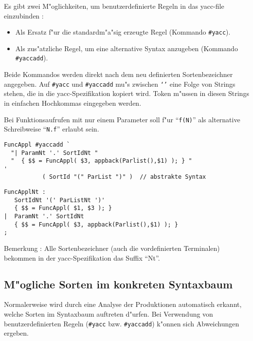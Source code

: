 Es gibt zwei M"oglichkeiten, um benutzerdefinierte Regeln in das yacc-file
einzubinden :

\begin{itemize}
\item Als Ersatz f"ur die standardm"a"sig erzeugte Regel
(Kommando {\tt \#yacc}).

\item Als zus"atzliche Regel, um eine alternative Syntax
anzugeben (Kommando {\tt \#yaccadd}).
\end{itemize}

\noindent
Beide Kommandos werden direkt nach dem neu definierten Sortenbezeichner
angegeben. Auf {\tt \#yacc} und {\tt \#yaccadd} mu"s zwischen {\tt `'}
eine Folge von Strings stehen, die in die yacc-Spezifikation kopiert wird.
Token m"ussen in diesen Strings in einfachen Hochkommas eingegeben werden.


\medskip\noindent
Bei Funktionsaufrufen mit nur einem Parameter soll f"ur "`{\tt f(N)}"' als
alternative Schreibweise "`{\tt N.f}"' erlaubt sein.

\begin{verbatim}
FuncAppl #yaccadd `
  "| ParamNt '.' SortIdNt "
  "  { $$ = FuncAppl( $3, appback(Parlist(),$1) ); } "
'
           ( SortId "(" ParList ")" )  // abstrakte Syntax
\end{verbatim}


\begin{verbatim}
FuncApplNt :
   SortIdNt '(' ParListNt ')'
   { $$ = FuncAppl( $1, $3 ); }
|  ParamNt '.' SortIdNt
   { $$ = FuncAppl( $3, appback(Parlist(),$1) ); }
;
\end{verbatim}

\noindent Bemerkung :
Alle Sortenbezeichner (auch die vordefinierten
Terminalen) bekommen in der yacc-Spezifikation das Suffix "`Nt"'.


\subsection{M"ogliche Sorten im konkreten Syntaxbaum}

Normalerweise wird durch eine Analyse der Produktionen automatisch erkannt,
welche Sorten im Syntaxbaum auftreten d"urfen. Bei Verwendung von
benutzerdefinierten Regeln ({\tt \#yacc} bzw. {\tt \#yaccadd}) k"onnen sich
Abweichungen ergeben.

